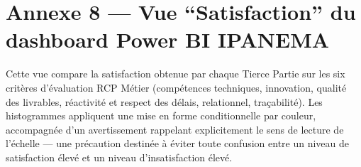 \begin{figure}[H]
    \centering
    \label{fig:annexe7_quality_agreements}
\end{figure}

\section*{Annexe 8 — Vue ``Satisfaction'' du dashboard Power BI IPANEMA}

Cette vue compare la satisfaction obtenue par chaque Tierce Partie sur les six
critères d'évaluation RCP Métier (compétences techniques, innovation, qualité des livrables,
réactivité et respect des délais, relationnel, traçabilité). Les histogrammes appliquent une
mise en forme conditionnelle par couleur, accompagnée d'un avertissement rappelant
explicitement le sens de lecture de l'échelle — une précaution destinée à éviter toute
confusion entre un niveau de satisfaction élevé et un niveau d'insatisfaction élevé.

\begin{figure}[H]
    \centering
    \label{fig:annexe8_satisfaction}
\end{figure}
    
